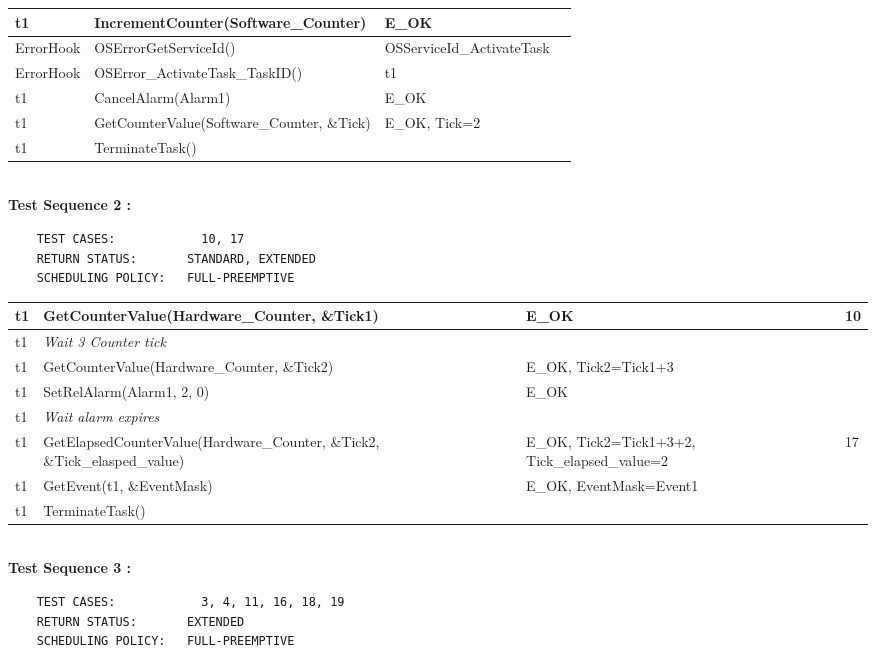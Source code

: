 \documentclass[10pt]{article}
\newlength{\Li}\settowidth{\Li}{Running}
\newlength{\Lii}\setlength{\Lii}{7cm}
\newlength{\Liiii}\setlength{\Liiii}{0.9cm}
\newlength{\Liii}\setlength{\Liii}{\textwidth} \addtolength{\Liii}{-\Li} \addtolength{\Liii}{-\Lii} \addtolength{\Liii}{-\Liiii}
\begin{document}
\begin{supertabular}{|p{\Li}|p{\Lii}|p{\Liii}|p{\Liiii}|}
	t1	& IncrementCounter(Software\_Counter)							& E\_OK					& \\ \hline
	ErrorHook		& OSErrorGetServiceId()								& OSServiceId\_ActivateTask	& \\ \hline
	ErrorHook		& OSError\_ActivateTask\_TaskID()						& t1						& \\ \hline
	t1	& CancelAlarm(Alarm1)										& E\_OK					& \\ \hline
	t1	& GetCounterValue(Software\_Counter, \&Tick)					& E\_OK, Tick=2			& \\ \hline
	t1	& TerminateTask()											& 						& \\ \hline
	\end{supertabular}\\

	\textbf{Test Sequence 2 :}
	\begin{lstlisting}
	TEST CASES:		       10, 17
	RETURN STATUS:	  	 STANDARD, EXTENDED
	SCHEDULING POLICY:   FULL-PREEMPTIVE
	\end{lstlisting}
	
	
	\begin{supertabular}{|p{\Li}|p{\Lii}|p{\Liii}|p{\Liiii}|} \hline 
	t1	& GetCounterValue(Hardware\_Counter, \&Tick1)					& E\_OK											& 10 \\ \hline
	t1	& \textit{Wait 3 Counter tick }									& 												& \\ \hline
	t1	& GetCounterValue(Hardware\_Counter, \&Tick2)					& E\_OK, Tick2=Tick1+3								& \\ \hline
	t1	& SetRelAlarm(Alarm1, 2, 0)									& E\_OK											& \\ \hline
	t1	& \textit{Wait alarm expires}									&												& \\ \hline
	t1	& GetElapsedCounterValue(Hardware\_Counter, \&Tick2, \&Tick\_elasped\_value)	& E\_OK, Tick2=Tick1+3+2, Tick\_elapsed\_value=2		& 17 \\ \hline
	t1	& GetEvent(t1, \&EventMask)									& E\_OK, EventMask=Event1							& \\ \hline 
	t1	& TerminateTask()																		& 					& \\ \hline
	\end{supertabular}\\
	
	\textbf{Test Sequence 3 :}
	\begin{lstlisting}
	TEST CASES:		       3, 4, 11, 16, 18, 19
	RETURN STATUS:	  	 EXTENDED
	SCHEDULING POLICY:   FULL-PREEMPTIVE
	\end{lstlisting}
	
	
\end{document}
